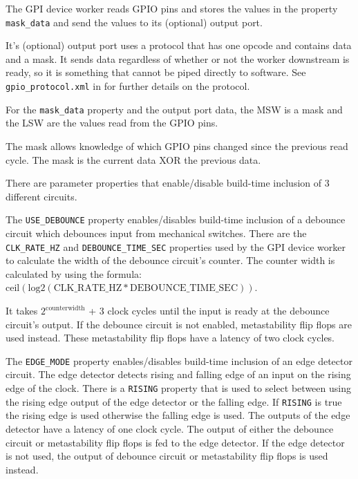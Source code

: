 \begin{flushleft}

The GPI device worker reads GPIO pins and stores the values in the property \texttt{mask\_data} and send the values to its (optional) output port. \newline

It's (optional) output port uses a protocol that has one opcode and contains data and a mask. It sends data regardless of whether or not the worker downstream is ready, so it is something that cannot be piped directly to software. See \texttt{gpio\_protocol.xml} in   for further details on the protocol. \newline

For the \texttt{mask\_data} property and the output port data, the MSW is a mask and the LSW are the values read from the GPIO pins. \newline

The mask allows knowledge of which GPIO pins changed since the previous read cycle. The mask is the current data XOR the previous data. \newline

There are parameter properties that enable/disable build-time inclusion of 3 different circuits.  \newline

The \texttt{USE\_DEBOUNCE} property enables/disables build-time inclusion of a debounce circuit which debounces input from mechanical switches. 
There are the \texttt{CLK\_RATE\_HZ} and \texttt{DEBOUNCE\_TIME\_SEC} properties used by the GPI device worker to calculate the width of the debounce circuit's counter. The counter width is calculated by using the formula: $\mathrm{ceil(log2(CLK\_RATE\_HZ * DEBOUNCE\_TIME\_SEC))}$. 

It takes $2^{\mathrm{counter width}}$ + 3 clock cycles until the input is ready at the debounce circuit's output. If the debounce circuit is not enabled, metastability flip flops are used instead. These metastability flip flops have a latency of two clock cycles. \newline

The \texttt{EDGE\_MODE} property enables/disables build-time inclusion of an edge detector circuit. The edge detector detects rising and falling edge of an input
on the rising edge of the clock. There is a \texttt{RISING} property that is used to select between using the rising edge output of the edge detector or the falling edge. If \texttt{RISING} is true the rising edge is used otherwise the falling edge is used. The outputs of the edge detector have a latency of one clock cycle. The output of either the debounce circuit or metastability flip flops is fed to the edge detector. If the edge detector is not used, the output of debounce circuit or metastability flip flops is used instead. \newline


\end{flushleft}
